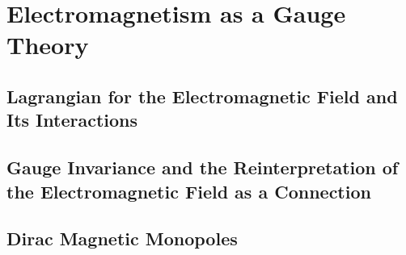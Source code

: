 \setcounter{chapter}{0}
\renewcommand{\thechapter}{9}
\chapter{Electromagnetism as a Gauge Theory}\label{ch:9}
\setcounter{equation}{0}	        %

\section{Lagrangian for the Electromagnetic Field and Its Interactions}

\section{Gauge Invariance and the Reinterpretation of the Electromagnetic Field as a Connection}

\section{Dirac Magnetic Monopoles}




